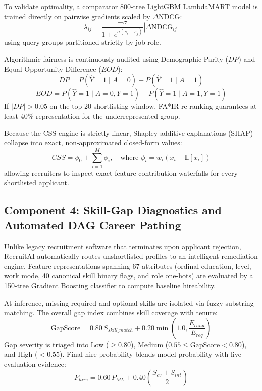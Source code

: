 \documentclass[conference]{IEEEtran}
\begin{document}
To validate optimality, a comparator 800-tree LightGBM LambdaMART model is trained directly on pairwise gradients scaled by $\Delta\text{NDCG}$:
\begin{equation}
\lambda_{ij} = \frac{-\sigma}{1 + e^{\sigma(s_i - s_j)}} |\Delta\text{NDCG}_{ij}|
\end{equation}
using query groups partitioned strictly by job role.

Algorithmic fairness is continuously audited using Demographic Parity ($DP$) and Equal Opportunity Difference ($EOD$):
\begin{equation}
DP = P(\hat{Y} = 1 \mid A = 0) - P(\hat{Y} = 1 \mid A = 1)
\end{equation}
\begin{equation}
EOD = P(\hat{Y} = 1 \mid A = 0, Y = 1) - P(\hat{Y} = 1 \mid A = 1, Y = 1)
\end{equation}
If $|DP| > 0.05$ on the top-20 shortlisting window, FA*IR re-ranking guarantees at least 40\% representation for the underrepresented group.

Because the CSS engine is strictly linear, Shapley additive explanations (SHAP) collapse into exact, non-approximated closed-form values:
\begin{equation}
CSS = \phi_0 + \sum_{i=1}^M \phi_i, \quad \text{where } \phi_i = w_i (x_i - \mathbb{E}[x_i])
\end{equation}
allowing recruiters to inspect exact feature contribution waterfalls for every shortlisted applicant.

\subsection{Component 4: Skill-Gap Diagnostics and Automated DAG Career Pathing}
Unlike legacy recruitment software that terminates upon applicant rejection, RecruitAI automatically routes unshortlisted profiles to an intelligent remediation engine. Feature representations spanning 67 attributes (ordinal education, level, work mode, 40 canonical skill binary flags, and role one-hots) are evaluated by a 150-tree Gradient Boosting classifier to compute baseline hireability.

At inference, missing required and optional skills are isolated via fuzzy substring matching. The overall gap index combines skill coverage with tenure:
\begin{equation}
\text{GapScore} = 0.80\,S_{skill\_match} + 0.20 \min\left(1.0, \frac{E_{cand}}{E_{req}}\right)
\end{equation}
Gap severity is triaged into Low ($\ge 0.80$), Medium ($0.55 \le \text{GapScore} < 0.80$), and High ($< 0.55$). Final hire probability blends model probability with live evaluation evidence:
\begin{equation}
P_{hire} = 0.60\,P_{ML} + 0.40 \left(\frac{S_{cv} + S_{int}}{2}\right)
\end{equation}
\end{document}
